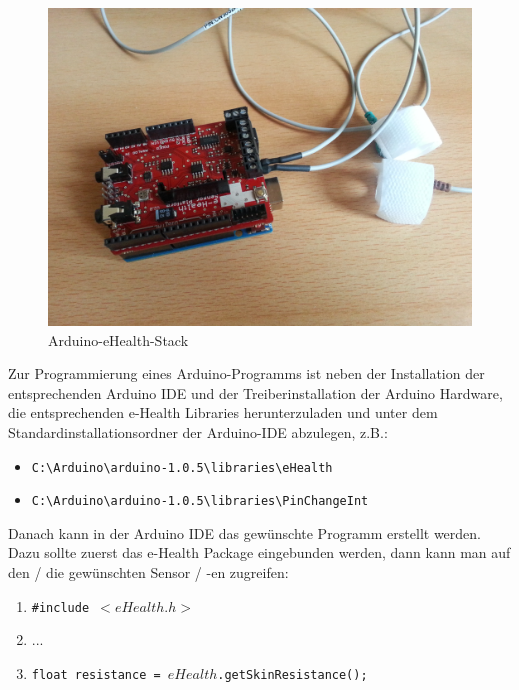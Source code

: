 \documentclass[10pt, a4paper, oneside, titlepage]{scrartcl} %
\begin{document}
	\begin{figure}[hbtp]
	\centering
	\includegraphics[scale=0.1]{img/Arduino+eHelath-Modul.jpg}
	\caption{Arduino-eHealth-Stack}
	\label{fig:Arduino-eHealth-Stack}
	\end{figure}
	
	
	Zur Programmierung eines Arduino-Programms ist neben der Installation der entsprechenden Arduino IDE und der Treiberinstallation der Arduino Hardware, die entsprechenden e-Health Libraries herunterzuladen und unter dem Standardinstallationsordner der Arduino-IDE abzulegen, z.B.:
	\begin{itemize}
	\item \texttt{C:\textbackslash Arduino\textbackslash arduino-1.0.5\textbackslash libraries\textbackslash eHealth}
	\item \texttt{C:\textbackslash Arduino\textbackslash arduino-1.0.5\textbackslash libraries\textbackslash PinChangeInt}
	\end{itemize}
	
	Danach kann in der Arduino IDE das gewünschte Programm erstellt werden. Dazu sollte zuerst das e-Health Package eingebunden werden, dann kann man auf den / die gewünschten Sensor / -en zugreifen:
	
	\begin{enumerate}
	 \item \texttt{\#include $ <eHealth.h> $}
	 \item ...
	 \item \texttt{float resistance = $eHealth$.getSkinResistance();}
	 \end{enumerate} 
	 
\end{document}
